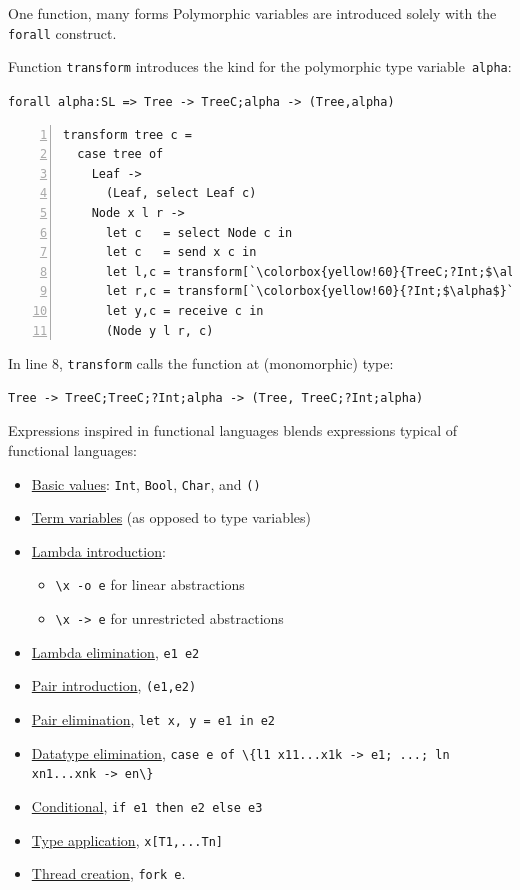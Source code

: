 \documentclass[10pt]{beamer}
\begin{document}
\begin{frame}[fragile]{One function, many forms}
	Polymorphic variables are introduced solely with the \lstinline|forall| construct.
	
	Function \lstinline|transform| introduces the kind for the
        polymorphic type variable~\lstinline|alpha|:
        
        \begin{center}
          \lstinline|forall alpha:SL => Tree -> TreeC;alpha -> (Tree,alpha)|
        \end{center}
\pause
\begin{lstlisting}[numbers=left, xleftmargin=0.7cm, escapeinside=\`\`, basicstyle=\sffamily\scriptsize]
transform tree c =
  case tree of
    Leaf ->
      (Leaf, select Leaf c)
    Node x l r ->
      let c   = select Node c in
      let c   = send x c in 
      let l,c = transform[`\colorbox{yellow!60}{TreeC;?Int;$\alpha$}`] l c in
      let r,c = transform[`\colorbox{yellow!60}{?Int;$\alpha$}`] r c in
      let y,c = receive c in
      (Node y l r, c)
\end{lstlisting}

\pause
In line 8, \lstinline|transform| calls the function at (monomorphic) type:
\begin{lstlisting}
Tree -> TreeC;TreeC;?Int;alpha -> (Tree, TreeC;?Int;alpha)
\end{lstlisting}
	
\end{frame}

\begin{frame}{Expressions {\small \color{mLightBrown}inspired in functional languages}}
\freest{} blends expressions typical of functional languages:
\begin{itemize}
\item \underline{Basic values}: \lstinline|Int|,
  \lstinline|Bool|, \lstinline|Char|, and \lstinline|()|
\item \underline{Term variables} (as opposed to type variables)
\item \underline{Lambda introduction}: 
\begin{itemize}
	\item \lstinline|\x -o e| for linear abstractions
	\item \lstinline|\x -> e| for unrestricted abstractions
\end{itemize}
\item \underline{Lambda elimination}, \lstinline|e1 e2|
\item \underline{Pair introduction}, \lstinline|(e1,e2)| 
\item \underline{Pair elimination},
  \lstinline|let x, y = e1 in e2| %
\item \underline{Datatype elimination},
  \lstinline|case e of \{l1 x11...x1k -> e1; ...; ln xn1...xnk -> en\}|
\item \underline{Conditional}, \lstinline|if e1 then e2 else e3|
\item \underline{Type application}, \lstinline|x[T1,...Tn]|
\item \underline{Thread creation}, \lstinline|fork e|.
\end{itemize}
\end{frame}
\end{document}
